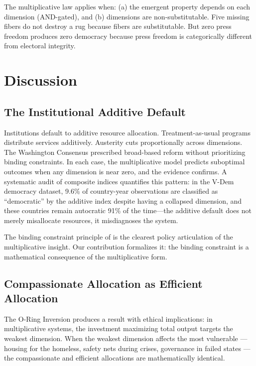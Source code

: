 \documentclass[12pt]{article}
\begin{document}
The multiplicative law applies when: (a) the emergent property depends on each dimension (AND-gated), and (b) dimensions are non-substitutable. Five missing fibers do not destroy a rug because fibers are substitutable. But zero press freedom produces zero democracy because press freedom is categorically different from electoral integrity.


\section{Discussion}
\label{sec:discussion}

\subsection{The Institutional Additive Default}

Institutions default to additive resource allocation. Treatment-as-usual programs distribute services additively. Austerity cuts proportionally across dimensions. The Washington Consensus prescribed broad-based reform without prioritizing binding constraints. In each case, the multiplicative model predicts suboptimal outcomes when any dimension is near zero, and the evidence confirms. A systematic audit of composite indices \cite{kirsch2026audit} quantifies this pattern: in the V-Dem democracy dataset, 9.6\% of country-year observations are classified as ``democratic'' by the additive index despite having a collapsed dimension, and these countries remain autocratic 91\% of the time---the additive default does not merely misallocate resources, it misdiagnoses the system.

The binding constraint principle of \citet{hrv2005} is the clearest policy articulation of the multiplicative insight. Our contribution formalizes it: the binding constraint is a mathematical consequence of the multiplicative form.

\subsection{Compassionate Allocation as Efficient Allocation}

The O-Ring Inversion produces a result with ethical implications: in multiplicative systems, the investment maximizing total output targets the weakest dimension. When the weakest dimension affects the most vulnerable --- housing for the homeless, safety nets during crises, governance in failed states --- the compassionate and efficient allocations are mathematically identical.
\end{document}
